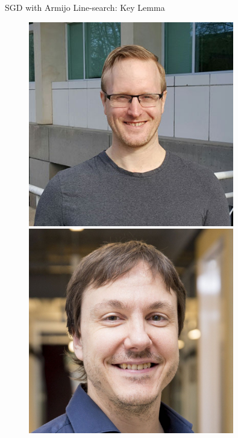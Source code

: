 \documentclass[mathserif,notheorems, hyperref={colorlinks, citecolor=blue, urlcolor=blue, linkcolor=blue}]{beamer}
\begin{document}
\begin{frame}{SGD with Armijo Line-search: Key Lemma}
\begin{minipage}[t]{0.15\textwidth}
\begin{figure}[t]
                \vspace{0.4ex}
                \includegraphics[width=0.8\textwidth]{collaborators/mark}

                \vspace{0.4ex}
                \includegraphics[width=0.8\textwidth]{collaborators/simon}
            \end{figure} 
       \end{minipage}

    \end{frame}
\end{document}
